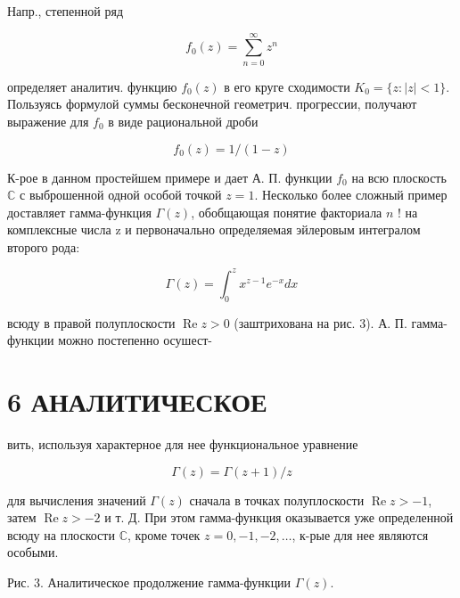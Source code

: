 \documentclass[10pt]{article}
\begin{document}
Напр., степенной ряд



\[

f_{0}(z)=\sum_{n=0}^{\infty} z^{n}

\]



определяет аналитич. функцию $f_{0}(z)$ в его круге сходимости $K_{0}=\{z:|z|<1\}$. Пользуясь формулой суммы бесконечной геометрич. прогрессии, получают выражение для $f_{0}$ в виде рациональной дроби



\[

f_{0}(z)=1 /(1-z)

\]



К-рое в данном простейшем примере и дает А. П. функции $f_{0}$ на всю плоскость $\mathbb{C}$ с выброшенной одной особой точкой $z=1$. Несколько более сложный пример доставляет гамма-функция $\Gamma(z)$, обобщающая понятие факториала $n$ ! на комплексные числа z и первоначально определяемая эйлеровым интегралом второго рода:



\[

\Gamma(z)=\int_{0}^{z} x^{z-1} e^{-x} d x

\]



всюду в правой полуплоскости $\operatorname{Re} z>0$ (заштрихована на рис. 3). А. П. гамма-функции можно постепенно осушест-



\section{6 АНАЛИТИЧЕСКОЕ}

вить, используя характерное для нее функциональное уравнение



\[

\Gamma(z)=\Gamma(z+1) / z

\]



для вычисления значений $\Gamma(z)$ сначала в точках полуплоскости $\operatorname{Re} z>-1$, затем $\operatorname{Re} z>-2$ и т. Д. При этом гамма-функция оказывается уже определенной всюду на плоскости $\mathbb{C}$, кроме точек $z=0,-1,-2, \ldots$, к-рые для нее являются особыми.



Рис. 3. Аналитическое продолжение гамма-функции $\Gamma(z)$.
\end{document}
